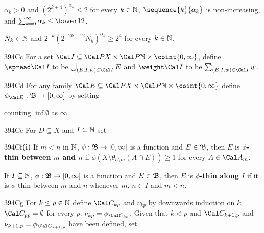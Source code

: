 \medskip

$\alpha_k>0$ and
$(2^{k+4})^{\alpha_k}\le 2$
for every $k\in\Bbb N$, $\sequence{k}{\alpha_k}$ is non-increasing,
and $\sum_{k=0}^{\infty}\alpha_k\le\bover12$.

\medskip

$N_k\in\Bbb N$ and
$2^{-k}(2^{-2k-12}N_k)^{\alpha_k}\ge 2^4$
for every $k\in\Bbb N$.

\spheader 394Cc %
   For a set
$\Cal I\subseteq\Cal PX\times\Cal P\Bbb N\times\coint{0,\infty}$,
define $\spread\Cal I$ to be 
$\bigcup_{(E,I,w)\in\Cal I}E$
and $\weight\Cal I$ to be $\sum_{(E,I,w)\in\Cal I}w$.

\spheader 394Cd %
For any family
$\Cal E\subseteq\Cal PX\times\Cal P\Bbb N\times\coint{0,\infty}$ define
$\phi_{\Cal E}:\frak B\to[0,\infty]$ by setting


\noindent counting $\inf\emptyset$ as $\infty$.   

\spheader 394Ce %
For $D\subseteq X$ and $I\subseteq\Bbb N$ set


\spheader 394Cf{\bf (i)} %
If $m<n$ in $\Bbb N$, $\phi:\frak B\to[0,\infty]$ is
a function and $E\in\frak B$, then $E$ is
{\bf $\phi$-thin between $m$ and $n$} if
$\phi(X\setminus\theta_{n\setminus m}(A\cap E))\ge 1$ for
every $A\in\Cal A_m$.

\medskip

 If $I\subseteq\Bbb N$,
$\phi:\frak B\to[0,\infty]$ is a function and $E\in\frak B$, then
$E$ is {\bf $\phi$-thin along $I$} if it is $\phi$-thin between $m$ and $n$
whenever $m$, $n\in I$ and $m<n$.

\spheader 394Cg %
For $k\le p\in\Bbb N$ define $\Cal C_{kp}$
and $\nu_{kp}$ by downwards induction on $k$.   
$\Cal C_{pp}=\emptyset$ for every $p$.
$\nu_{kp}=\phi_{\Cal C_{kp}}$.
Given that $k<p$ and
$\Cal C_{k+1,p}$
and $\nu_{k+1,p}=\phi_{\Cal C_{k+1,p}}$ have been defined, set

